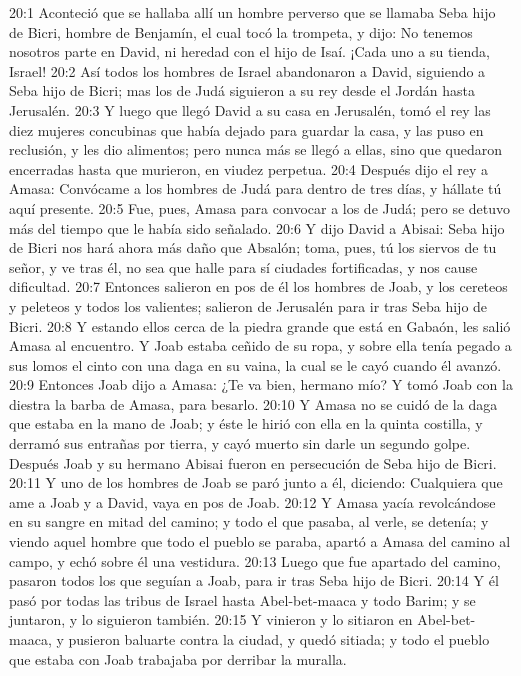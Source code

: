 20:1 Aconteció que se hallaba allí un hombre perverso que se llamaba Seba hijo de Bicri, hombre de Benjamín, el cual tocó la trompeta, y dijo: No tenemos nosotros parte en David, ni heredad con el hijo de Isaí. ¡Cada uno a su tienda, Israel! 
20:2 Así todos los hombres de Israel abandonaron a David, siguiendo a Seba hijo de Bicri; mas los de Judá siguieron a su rey desde el Jordán hasta Jerusalén.  
20:3 Y luego que llegó David a su casa en Jerusalén, tomó el rey las diez mujeres concubinas que había dejado para guardar la casa, y las puso en reclusión, y les dio alimentos; pero nunca más se llegó a ellas, sino que quedaron encerradas hasta que murieron, en viudez perpetua.  
20:4 Después dijo el rey a Amasa: Convócame a los hombres de Judá para dentro de tres días, y hállate tú aquí presente.  
20:5 Fue, pues, Amasa para convocar a los de Judá; pero se detuvo más del tiempo que le había sido señalado.  
20:6 Y dijo David a Abisai: Seba hijo de Bicri nos hará ahora más daño que Absalón; toma, pues, tú los siervos de tu señor, y ve tras él, no sea que halle para sí ciudades fortificadas, y nos cause dificultad.  
20:7 Entonces salieron en pos de él los hombres de Joab, y los cereteos y peleteos y todos los valientes; salieron de Jerusalén para ir tras Seba hijo de Bicri.  
20:8 Y estando ellos cerca de la piedra grande que está en Gabaón, les salió Amasa al encuentro. Y Joab estaba ceñido de su ropa, y sobre ella tenía pegado a sus lomos el cinto con una daga en su vaina, la cual se le cayó cuando él avanzó.  
20:9 Entonces Joab dijo a Amasa: ¿Te va bien, hermano mío? Y tomó Joab con la diestra la barba de Amasa, para besarlo.  
20:10 Y Amasa no se cuidó de la daga que estaba en la mano de Joab; y éste le hirió con ella en la quinta costilla, y derramó sus entrañas por tierra, y cayó muerto sin darle un segundo golpe. Después Joab y su hermano Abisai fueron en persecución de Seba hijo de Bicri.  
20:11 Y uno de los hombres de Joab se paró junto a él, diciendo: Cualquiera que ame a Joab y a David, vaya en pos de Joab.  
20:12 Y Amasa yacía revolcándose en su sangre en mitad del camino; y todo el que pasaba, al verle, se detenía; y viendo aquel hombre que todo el pueblo se paraba, apartó a Amasa del camino al campo, y echó sobre él una vestidura.  
20:13 Luego que fue apartado del camino, pasaron todos los que seguían a Joab, para ir tras Seba hijo de Bicri.  
20:14 Y él pasó por todas las tribus de Israel hasta Abel-bet-maaca y todo Barim; y se juntaron, y lo siguieron también.  
20:15 Y vinieron y lo sitiaron en Abel-bet-maaca, y pusieron baluarte contra la ciudad, y quedó sitiada; y todo el pueblo que estaba con Joab trabajaba por derribar la muralla.  
